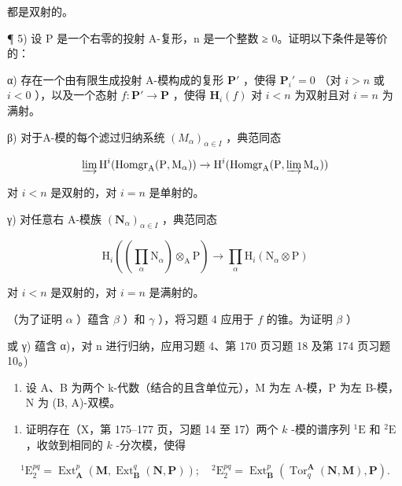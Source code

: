 都是双射的。

¶ 5) 设 P 是一个右零的投射 A-复形，n 是一个整数 ≥ 0。证明以下条件是等价的：

α) 存在一个由有限生成投射 A-模构成的复形 \(\mathbf{P}'\) ，使得 \(\mathbf{P}_i' = 0\) （对 \(i > n\) 或 \(i < 0\) ），以及一个态射 \(f: \mathbf{P}' \to \mathbf{P}\) ，使得 \(\mathbf{H}_i(f)\) 对 \(i < n\) 为双射且对 \(i = n\) 为满射。

β) 对于A-模的每个滤过归纳系统 \((M_{\alpha})_{\alpha \in I}\) ，典范同态

\[
\varinjlim \mathrm{H} ^ {i} (\operatorname{Homgr} _ {\mathrm{A}} (\mathrm{P}, \mathrm{M} _ {\alpha})) \rightarrow \mathrm{H} ^ {i} (\operatorname{Homgr} _ {\mathrm{A}} (\mathrm{P}, \varinjlim \mathrm{M} _ {\alpha}))
\]

对 \(i < n\) 是双射的，对 \(i = n\) 是单射的。

γ) 对任意右 A-模族 \((\mathbf{N}_{\alpha})_{\alpha\in I}\) ，典范同态

\[
\mathrm{H} _ {i} ((\prod_ {\alpha} \mathrm{N} _ {\alpha}) \otimes_ {\mathrm{A}} \mathrm{P}) \rightarrow \prod_ {\alpha} \mathrm{H} _ {i} (\mathrm{N} _ {\alpha} \otimes \mathrm{P})
\]

对 \(i < n\) 是双射的，对 \(i = n\) 是满射的。

（为了证明 \(\alpha\) ）蕴含 \(\beta\) ）和 \(\gamma\) ），将习题 4 应用于 \(f\) 的锥。为证明 \(\beta\) ）

或 γ) 蕴含 α)，对 n 进行归纳，应用习题 4、第 170 页习题 18 及第 174 页习题 10。)

\begin{enumerate}
\def\labelenumi{\arabic{enumi})}
\setcounter{enumi}{5}
\tightlist
\item
  设 A、B 为两个 k-代数（结合的且含单位元），M 为左 A-模，P 为左 B-模，N 为 (B, A)-双模。
\end{enumerate}

\begin{enumerate}
\def\labelenumi{\alph{enumi})}
\tightlist
\item
  证明存在（X，第 175–177 页，习题 14 至 17）两个 \(k\) -模的谱序列 \({}^{1}\mathrm{E}\) 和 \({}^{2}\mathrm{E}\) ，收敛到相同的 \(k\) -分次模，使得
\end{enumerate}

\[
{ } ^ { 1 } \mathrm{E} _ { 2 } ^ { p q } = \operatorname{Ext} _ { \mathbf { A } } ^ { p } ( \mathbf { M } , \operatorname{Ext} _ { \mathbf { B } } ^ { q } ( \mathbf { N } , \mathbf { P } ) ) ; \quad { } ^ { 2 } \mathrm{E} _ { 2 } ^ { p q } = \operatorname{Ext} _ { \mathbf { B } } ^ { p } ( \operatorname{Tor} _ { q } ^ { \mathbf { A } } ( \mathbf { N } , \mathbf { M } ) , \mathbf { P } ) .
\]

